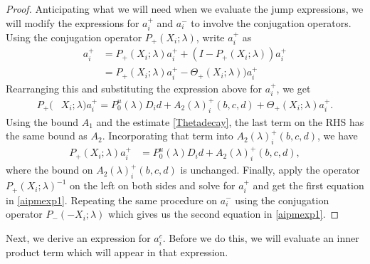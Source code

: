 \documentclass[thesis.tex]{subfiles}
\begin{document}
\begin{lemma}
\begin{proof}
Anticipating what we will need when we evaluate the jump expressions, we will modify the expressions for $a_i^+$ and $a_i^-$ to involve the conjugation operators. Using the conjugation operator $P_+(X_i; \lambda)$, write $a_i^+$ as
\begin{align*}
a_i^+ &= P_+(X_i; \lambda)a_i^+ + (I - P_+(X_i; \lambda))a_i^+ \\
&= P_+(X_i; \lambda)a_i^+ - \Theta_+(X_i; \lambda))a_i^+
\end{align*}
Rearranging this and substituting the expression above for $a_i^+$, we get
\begin{align*}
P_+(&X_i; \lambda) a_i^+ = P_0^u(\lambda) D_i d + A_2(\lambda)_i^+(b, c, d) + \Theta_+(X_i; \lambda)a_i^+.
\end{align*}
Using the bound $A_1$ and the estimate \eqref{Thetadecay}, the last term on the RHS has the same bound as $A_2$. Incorporating that term into $A_2(\lambda)_i^+(b, c, d)$, we have
\begin{align*}
P_+(X_i; \lambda)a_i^+ &= P_0^u(\lambda) D_i d + A_2(\lambda)_i^+(b, c, d),
\end{align*}
where the bound on $A_2(\lambda)_i^+(b, c, d)$ is unchanged. Finally, apply the operator $P_+(X_i; \lambda)^{-1}$ on the left on both sides and solve for $a_i^+$ and get the first equation in \cref{aipmexp1}. Repeating the same procedure on $a_i^-$ using the conjugation operator $P_-(-X_i; \lambda)$ which gives us the second equation in \cref{aipmexp1}.
\end{proof}
\end{lemma}

Next, we derive an expression for $a_i^c$. Before we do this, we will evaluate an inner product term which will appear in that expression.
\end{document}
